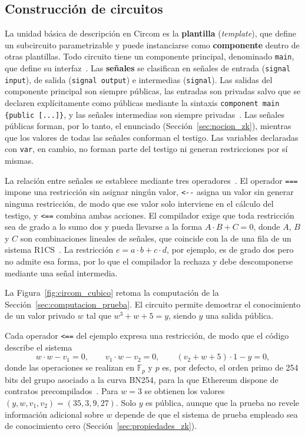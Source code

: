 \subsection{Construcción de circuitos}
\label{sec:circom_construccion}

La unidad básica de descripción en Circom es la \textbf{plantilla} (\textit{template}), que
define un subcircuito parametrizable y puede instanciarse como \textbf{componente} dentro de
otras plantillas. Todo circuito tiene un componente principal, denominado \lstinline|main|, que
define su interfaz~\cite{circomdocs}. Las \textbf{señales} se clasifican en señales de entrada
(\lstinline|signal input|), de salida (\lstinline|signal output|) e intermedias
(\lstinline|signal|). Las salidas del componente principal son siempre públicas, las entradas son
privadas salvo que se declaren explícitamente como públicas mediante la sintaxis
\lstinline[breaklines=true]|component main {public [...]}|, y las señales intermedias son siempre
privadas~\cite{circomdocs}. Las señales públicas forman, por lo tanto, el enunciado
(Sección~\ref{sec:nocion_zk}), mientras que los valores de todas las señales conforman el
testigo. Las variables declaradas con \lstinline|var|, en cambio, no forman parte del testigo ni
generan restricciones por sí mismas.

La relación entre señales se establece mediante tres operadores~\cite{circomdocs}. El operador
\lstinline|===| impone una restricción sin asignar ningún valor, \lstinline|<--| asigna un valor
sin generar ninguna restricción, de modo que ese valor solo interviene en el cálculo del testigo,
y \lstinline|<==| combina ambas acciones. El compilador exige que toda restricción sea de grado a
lo sumo dos y pueda llevarse a la forma $A \cdot B + C = 0$, donde $A$, $B$ y $C$ son
combinaciones lineales de señales, que coincide con la de una fila de un sistema
R1CS~\cite{circomdocs}. La restricción $e = a \cdot b + c \cdot d$, por ejemplo, es de grado dos
pero no admite esa forma, por lo que el compilador la rechaza y debe descomponerse mediante una
señal intermedia.

La Figura~\ref{fig:circom_cubico} retoma la computación de la
Sección~\ref{sec:computacion_prueba}. El circuito permite demostrar el conocimiento de un valor
privado $w$ tal que $w^{3} + w + 5 = y$, siendo $y$ una salida pública.

Cada operador \lstinline|<==| del ejemplo expresa una restricción, de modo que el código
describe el sistema
\begin{equation}
	\label{eq:circom_cubico}
	w \cdot w - v_1 = 0, \qquad v_1 \cdot w - v_2 = 0, \qquad (v_2 + w + 5) \cdot 1 - y = 0,
\end{equation}
donde las operaciones se realizan en $\mathbb{F}_p$ y $p$ es, por defecto, el orden primo de
254 bits del grupo asociado a la curva BN254, para la que Ethereum dispone de contratos
precompilados~\cite{circomdocs, eip197}. Para $w = 3$ se obtienen los valores
$(y, w, v_1, v_2) = (35, 3, 9, 27)$. Solo $y$ es pública, aunque que la prueba no revele
información adicional sobre $w$ depende de que el sistema de prueba empleado sea de conocimiento
cero (Sección~\ref{sec:propiedades_zk}).

